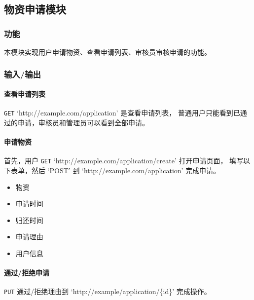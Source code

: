 \documentclass[a4paper,fancyhdr,fntef,hyperref]{ctexart}
\begin{document}
\subsection{物资申请模块}\label{ux7269ux8d44ux7533ux8bf7ux6a21ux5757}

\subsubsection{功能}\label{ux529fux80fd-3}

本模块实现用户申请物资、查看申请列表、审核员审核申请的功能。

\subsubsection{输入/输出}\label{ux8f93ux5165ux8f93ux51fa-3}

\paragraph{查看申请列表}\label{ux67e5ux770bux7533ux8bf7ux5217ux8868}

\texttt{GET} `http://example.com/application' 是查看申请列表，
普通用户只能看到已通过的申请，审核员和管理员可以看到全部申请。

\paragraph{申请物资}\label{ux7533ux8bf7ux7269ux8d44-1}

首先，用户 \texttt{GET} `http://example.com/application/create'
打开申请页面， 填写以下表单，然后 `POST' 到
`http://example.com/application' 完成申请。

\begin{itemize}
\itemsep1pt\parskip0pt
\item
  物资
\item
  申请时间
\item
  归还时间
\item
  申请理由
\item
  用户信息
\end{itemize}

\paragraph{通过/拒绝申请}\label{ux901aux8fc7ux62d2ux7eddux7533ux8bf7}

\texttt{PUT} 通过/拒绝理由到 `http://example/application/\{id\}'
完成操作。
\end{document}

